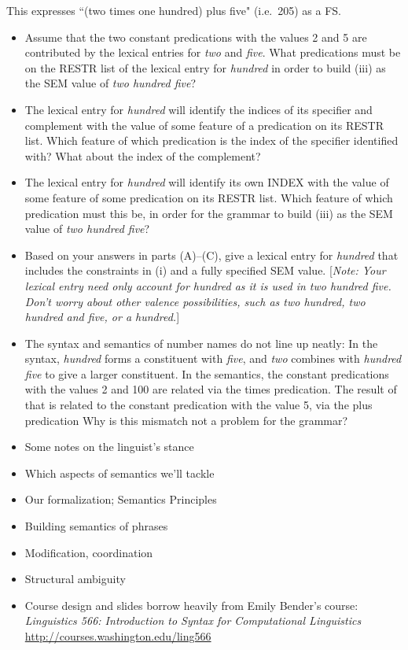 \documentclass[a4paper,landscape,headrule,footrule]{foils}
\begin{document}
\noindent
This  expresses ``(two times one hundred) plus five" (i.e.\ 
205) as a FS.

\begin{itemize} 

\item[A.] Assume that the two constant 
predications
with the values 2 and
5 are contributed by the lexical entries for {\it two} and {\it five}.
What predications must be on the \index{RESTR}RESTR list of the lexical entry for
{\it hundred} in order to build (iii) as the SEM value of {\it two
hundred five}?
\item[B.] The lexical entry for {\it hundred} will identify the
indices of its specifier and complement with the value of some feature
of a predication on its RESTR list.  Which feature of which predication
is the \index{index}index of the specifier identified with?  What about the index
of the complement?
\item[C.] The lexical entry for {\it hundred} will identify its
own INDEX with the value of some feature of some predication on
its RESTR list.  Which feature of which predication must this
be, in order for the grammar 
to build (iii) as the SEM value of {\it two hundred five}?

\newpage

\item[D.] Based on your answers in parts (A)--(C), 
give a lexical entry for {\it hundred} that includes
the constraints in (i) and a fully specified SEM value.  
[{\sl Note: Your lexical entry need only account for {\it hundred}
as it is used in {\it two hundred five}. Don't worry about other
valence possibilities, such as 
{\it two hundred}, {\it two hundred and five}, or {\it a hundred}.}]
\item[E.] The syntax and semantics of number names do
not line up neatly: In the syntax, {\it hundred} forms a constituent
with {\it five}, and {\it two} combines with {\it hundred five} to
give a larger constituent.  In the semantics, the constant
predications
with the values 2 and 100 are related via the times 
predication.
The result of that is related to the constant 
predication
with the value
5, via the plus 
predication
Why is this mismatch not a problem for the grammar?
\end{itemize}




\begin{itemize}
\item Some notes on the linguist's stance
\item Which aspects of semantics we’ll tackle
\item Our formalization; Semantics Principles
\item Building semantics of phrases
\item Modification, coordination
\item Structural ambiguity
\end{itemize}


\begin{itemize}
\item Course design and slides borrow heavily from Emily Bender's course:
\textit{Linguistics 566: Introduction to Syntax for Computational Linguistics}
\\ \url{http://courses.washington.edu/ling566}
\end{itemize}

%
\end{document}

